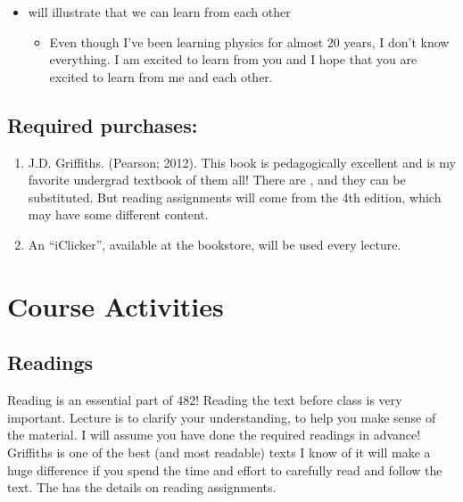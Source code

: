 \documentclass[letterpaper,10pt,english]{jupyterBook}
\begin{document}
\begin{itemize}
\begin{itemize}
\end{itemize}

\item {} 
 will illustrate that we can learn from each other
\begin{itemize}
\item {} 
\sphinxAtStartPar
Even though I’ve been learning physics for almost 20 years, I don’t know everything. I am excited to learn from you and I hope that you are excited to learn from me and each other.

\end{itemize}

\end{itemize}


\subsection{Required purchases:}
\label{\detokenize{content/0_course/design:required-purchases}}\begin{enumerate}
%
\item {} 
\sphinxAtStartPar
J.D. Griffiths.  (Pearson; 2012). This book is
pedagogically excellent and is my favorite undergrad textbook of
them all! There are , and they can be substituted. But
reading assignments will come from the 4th edition, which may have
some different content.

\item {} 
\sphinxAtStartPar
An “iClicker”, available at the bookstore, will be used
every lecture.

\end{enumerate}


\section{Course Activities}
\label{\detokenize{content/0_course/design:course-activities}}

\subsection{Readings}
\label{\detokenize{content/0_course/design:readings}}
\sphinxAtStartPar
Reading is an essential part of 482! Reading the text before class is
very important. Lecture is to clarify your understanding, to help you
make sense of the material. I will assume you have done the required
readings in advance! Griffiths is one of the best (and most readable)
texts I know of \sphinxhyphen{} it will make a huge difference if you spend the time
and effort to carefully read and follow the text. The
 has the details on reading assignments.
\end{document}
